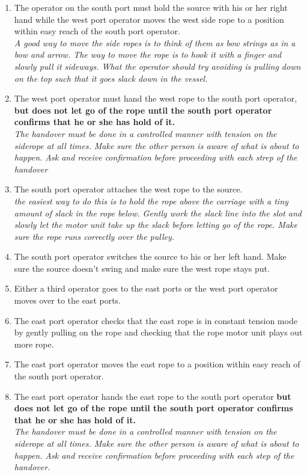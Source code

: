 \documentclass[11pt]{article}
\begin{document}
\begin{enumerate}
\item \CheckBox[name=aesr6]{} The operator on the south port must hold the source with his or her right hand while the west port operator moves the west side rope to a position within easy reach of the south port operator.\\ {\it A good way to move the side ropes is to think of them as bow strings as in a bow and arrow. The way to move the rope is to hook it with a finger and slowly pull it sideways. What the operator should try avoiding is pulling down on the top such that it goes slack down in the vessel.}
\item \CheckBox[name=aesr7]{} The west port operator must hand the west rope to the south port operator, {\bf but does not let go of the rope until the south port operator confirms that he or she has hold of it.}\\ {\it The handover must be done in a controlled manner with tension on the siderope at all times. Make sure the other person is aware of what is about to happen. Ask and receive confirmation before proceeding with each strep of the handover}
\item \CheckBox[name=aesr8]{} The south port operator attaches the west rope to the source. \\ {\it the easiest way to do this is to hold the rope above the carriage with a tiny amount of slack in the rope below. Gently work the slack line into the slot and slowly let the motor unit take up the slack before letting go of the rope. Make sure the rope runs correctly over the pulley.}
\item \CheckBox[name=aesr9]{} The south port operator switches the source to his or her left hand. Make sure the source doesn't swing and make sure the west rope stays put.
\item \CheckBox[name=aesr10]{} Either a third operator goes to the east ports or the west port operator moves over to the east ports.
\item \CheckBox[name=aesr11]{} The east port operator checks that the east rope is in constant tension mode by gently pulling on the rope and checking that the rope motor unit plays out more rope.
\item \CheckBox[name=aesr12]{} The east port operator moves the east rope to a position within easy reach of the south port operator.
\item \CheckBox[name=aesr13]{} The east port operator hands the east rope to the south port operator {\bf but does not let go of the rope until the south port operator confirms that he or she has hold of it.} \\ {\it The handover must be done in a controlled manner with tension on the siderope at all times. Make sure the other person is aware of what is about to happen. Ask and receive confirmation before proceeding with each step of the handover.}

\end{enumerate}
\end{document}
